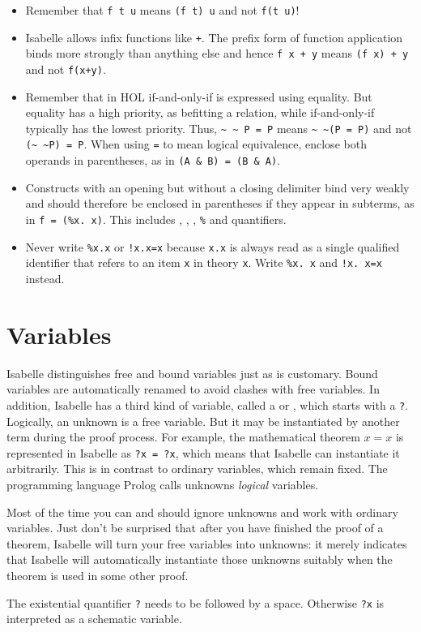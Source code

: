 \begin{itemize}
\item
Remember that \texttt{f t u} means \texttt{(f t) u} and not \texttt{f(t u)}!
\item
Isabelle allows infix functions like \texttt{+}. The prefix form of function
application binds more strongly than anything else and hence \texttt{f~x + y}
means \texttt{(f~x)~+~y} and not \texttt{f(x+y)}.
\item
Remember that in HOL if-and-only-if is expressed using equality.  But equality
has a high priority, as befitting a  relation, while if-and-only-if typically
has the lowest priority.  Thus, \verb$~ ~ P = P$ means \verb$~ ~(P = P)$ and
not \verb$(~ ~P) = P$. When using \texttt{=} to mean logical equivalence,
enclose both operands in parentheses, as in \texttt{(A \& B) = (B \& A)}.
\item
Constructs with an opening but without a closing delimiter bind very weakly
and should therefore be enclosed in parentheses if they appear in subterms, as
in \texttt{f = (\%x.~x)}. This includes
, , , \verb$%$ and quantifiers.
\item
Never write \texttt{\%x.x} or \texttt{!x.x=x} because \texttt{x.x} is always
read as a single qualified identifier that refers to an item \texttt{x} in
theory \texttt{x}. Write \texttt{\%x.~x} and \texttt{!x.~x=x} instead.
\end{itemize}

\section{Variables}
\label{sec:variables}

Isabelle distinguishes free and bound variables just as is customary. Bound
variables are automatically renamed to avoid clashes with free variables. In
addition, Isabelle has a third kind of variable, called a  or , which starts with a \texttt{?}.  Logically,
an unknown is a free variable. But it may be instantiated by another term
during the proof process. For example, the mathematical theorem $x = x$ is
represented in Isabelle as \texttt{?x = ?x}, which means that Isabelle can
instantiate it arbitrarily. This is in contrast to ordinary variables, which
remain fixed. The programming language Prolog calls unknowns {\em logical\/}
variables.

Most of the time you can and should ignore unknowns and work with ordinary
variables. Just don't be surprised that after you have finished the
proof of a theorem, Isabelle will turn your free variables into unknowns: it
merely indicates that Isabelle will automatically instantiate those unknowns
suitably when the theorem is used in some other proof.
\begin{warn}
  The existential quantifier \texttt{?} needs to be
  followed by a space. Otherwise \texttt{?x} is interpreted as a schematic
  variable.
\end{warn}


